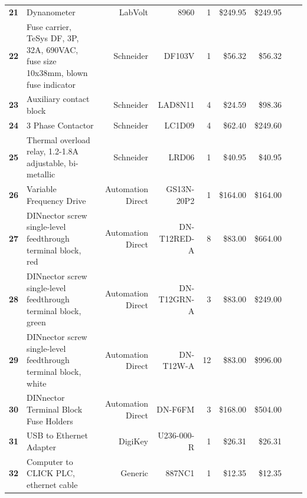 \begin{table}[!htp]
{\begin{tabular}{llrrrrrrr}
			\textbf{21}    & Dynanometer                                                                      & LabVolt           & 8960              & 1        & \$249.95 & \$249.95       \\
			\textbf{22}    & Fuse carrier, TeSys DF, 3P, 32A, 690VAC, fuse size 10x38mm, blown fuse indicator & Schneider         & DF103V            & 1        & \$56.32  & \$56.32        \\
			\textbf{23}    & Auxiliary contact block                                                          & Schneider         & LAD8N11           & 4        & \$24.59  & \$98.36        \\
			\textbf{24}    & 3 Phase Contactor                                                                & Schneider         & LC1D09            & 4        & \$62.40  & \$249.60       \\
			\textbf{25}    & Thermal overload relay, 1.2-1.8A adjustable, bi-metallic                         & Schneider         & LRD06             & 1        & \$40.95  & \$40.95        \\
			\textbf{26}    & Variable Frequency Drive                                                         & Automation Direct & GS13N-20P2        & 1        & \$164.00 & \$164.00       \\
			\textbf{27}    & DINnector screw single-level feedthrough terminal block, red                     & Automation Direct & DN-T12RED-A       & 8        & \$83.00  & \$664.00       \\
			\textbf{28}    & DINnector screw single-level feedthrough terminal block, green                   & Automation Direct & DN-T12GRN-A       & 3        & \$83.00  & \$249.00       \\
			\textbf{29}    & DINnector screw single-level feedthrough terminal block, white                   & Automation Direct & DN-T12W-A         & 12       & \$83.00  & \$996.00       \\
			\textbf{30}    & DINnector Terminal Block Fuse Holders                                            & Automation Direct & DN-F6FM           & 3        & \$168.00 & \$504.00       \\
			\textbf{31}    & USB to Ethernet Adapter                                                          & DigiKey           & U236-000-R        & 1        & \$26.31  & \$26.31        \\
			\textbf{32}    & Computer to CLICK PLC, ethernet cable                                            & Generic           & 887NC1            & 1        & \$12.35  & \$12.35        \\

\end{tabular}}
\end{table}
